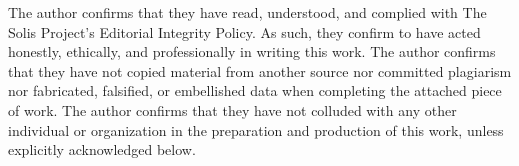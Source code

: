 The author confirms that they have read, understood, and complied with The Solis Project’s Editorial Integrity Policy.
As such, they confirm to have acted honestly, ethically, and professionally in writing this work.
The author confirms that they have not copied material from another source nor committed plagiarism nor fabricated, falsified, or embellished data when completing the attached piece of work. The author confirms that they have not colluded with any other individual or organization in the preparation and production of this work, unless explicitly acknowledged below.
